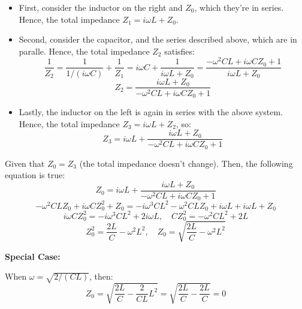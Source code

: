 \documentclass{article}
\begin{document}
\begin{itemize}
    \item First, consider the inductor on the right and $Z_0$, which they're in series. Hence, the total impedance $Z_1 = i\omega L+Z_0$.
    \item Second, consider the capacitor, and the series described above, which are in paralle. Hence, the total impedance $Z_2$ satisfies:
    $$\frac{1}{Z_2}=\frac{1}{1/(i\omega C)}+\frac{1}{Z_1} = i\omega C+\frac{1}{i\omega L+Z_0}=\frac{-\omega^2CL+i\omega CZ_0+1}{i\omega L+Z_0}$$
    $$Z_2=\frac{i\omega L+Z_0}{-\omega^2CL +i\omega CZ_0+1}$$
    \item Lastly, the inductor on the left is again in series with the above system. Hence, the total impedance $Z_3 = i\omega L+Z_2$, so:
    $$Z_3 = i\omega L+\frac{i\omega L+Z_0}{-\omega^2CL +i\omega CZ_0+1}$$
\end{itemize}
Given that $Z_0=Z_3$ (the total impedance doesn't change). Then, the following equation is true:
$$Z_0=i\omega L+\frac{i\omega L+Z_0}{-\omega^2CL +i\omega CZ_0+1}$$
$$-\omega^2CLZ_0+i\omega CZ_0^2+Z_0=-i\omega^3CL^2-\omega^2CLZ_0+i\omega L+i\omega L+Z_0$$
$$i\omega CZ_0^2=-i\omega^3CL^2+2i\omega L,\quad CZ_0^2=-\omega^2CL^2+2L$$
$$Z_0^2=\frac{2L}{C}-\omega^2L^2,\quad Z_0 = \sqrt{\frac{2L}{C}-\omega^2L^2}$$

\hfill

\textbf{Special Case:}

When $\omega=\sqrt{2/(CL)}$, then:
$$Z_0=\sqrt{\frac{2L}{C}-\frac{2}{CL}L^2}=\sqrt{\frac{2L}{C}-\frac{2L}{C}}=0$$

\hfill

\hfill
\end{document}
